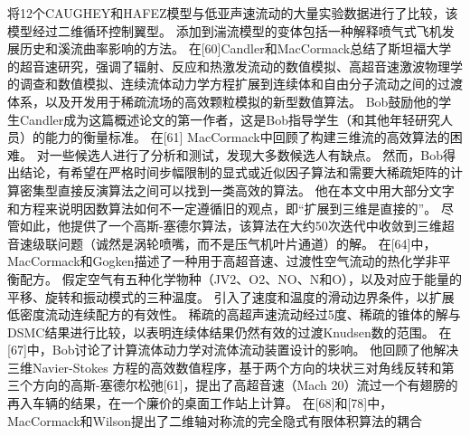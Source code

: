 \documentclass[UTF8,11pt,a4paper,openany,fontset=fandol]{ctexbook}
\begin{document}
将12个CAUGHEY和HAFEZ模型与低亚声速流动的大量实验数据进行了比较，该模型经过二维循环控制翼型。 添加到湍流模型的变体包括一种解释喷气式飞机发展历史和溪流曲率影响的方法。 在[60]Candler和MacCormack总结了斯坦福大学的超音速研究，强调了辐射、反应和热激发流动的数值模拟、高超音速激波物理学的调查和数值模拟、连续流体动力学方程扩展到连续体和自由分子流动之间的过渡体系，以及开发用于稀疏流场的高效颗粒模拟的新型数值算法。 Bob鼓励他的学生Candler成为这篇概述论文的第一作者，这是Bob指导学生（和其他年轻研究人员）的能力的衡量标准。 在[61] MacCormack中回顾了构建三维流的高效算法的困难。 对一些候选人进行了分析和测试，发现大多数候选人有缺点。 然而，Bob得出结论，有希望在严格时间步幅限制的显式或近似因子算法和需要大稀疏矩阵的计算密集型直接反演算法之间可以找到一类高效的算法。 他在本文中用大部分文字和方程来说明因数算法如何不一定遵循旧的观点，即“扩展到三维是直接的”。 尽管如此，他提供了一个高斯-塞德尔算法，该算法在大约50次迭代中收敛到三维超音速级联问题（诚然是涡轮喷嘴，而不是压气机叶片通道）的解。 在[64]中，MacCormack和Gogken描述了一种用于高超音速、过渡性空气流动的热化学非平衡配方。 假定空气有五种化学物种（JV2、O2、NO、N和O），以及对应于能量的平移、旋转和振动模式的三种温度。 引入了速度和温度的滑动边界条件，以扩展低密度流动连续配方的有效性。 稀疏的高超声速流动经过5度、稀疏的锥体的解与DSMC结果进行比较，以表明连续体结果仍然有效的过渡Knudsen数的范围。 在[67]中，Bob讨论了计算流体动力学对流体流动装置设计的影响。 他回顾了他解决三维Navier-Stokes 方程的高效数值程序，基于两个方向的块状三对角线反转和第三个方向的高斯-塞德尔松弛[61]，提出了高超音速（Mach 20）流过一个有翅膀的再入车辆的结果，在一个廉价的桌面工作站上计算。 在[68]和[78]中，MacCormack和Wilson提出了二维轴对称流的完全隐式有限体积算法的耦合
\end{document}
